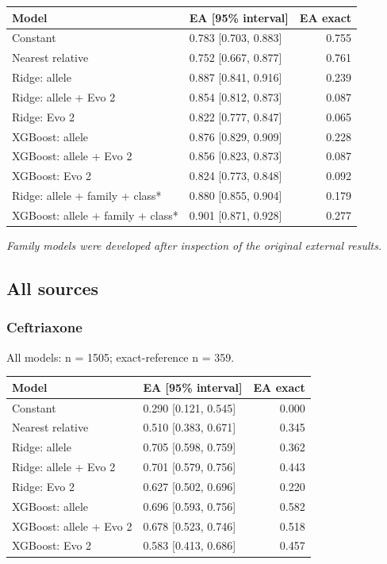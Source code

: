 \documentclass[
  10pt,
]{article}
\newcounter{none} %
\begin{document}
{\def\LTcaptype{none} %
\begin{longtable}[]{@{}llr@{}}
\toprule\noalign{}
Model & EA {[}95\% interval{]} & EA exact \\
\midrule\noalign{}
\endhead
\bottomrule\noalign{}
\endlastfoot
Constant & 0.783 {[}0.703, 0.883{]} & 0.755 \\
Nearest relative & 0.752 {[}0.667, 0.877{]} & 0.761 \\
Ridge: allele & 0.887 {[}0.841, 0.916{]} & 0.239 \\
Ridge: allele + Evo 2 & 0.854 {[}0.812, 0.873{]} & 0.087 \\
Ridge: Evo 2 & 0.822 {[}0.777, 0.847{]} & 0.065 \\
XGBoost: allele & 0.876 {[}0.829, 0.909{]} & 0.228 \\
XGBoost: allele + Evo 2 & 0.856 {[}0.823, 0.873{]} & 0.087 \\
XGBoost: Evo 2 & 0.824 {[}0.773, 0.848{]} & 0.092 \\
Ridge: allele + family + class* & 0.880 {[}0.855, 0.904{]} & 0.179 \\
XGBoost: allele + family + class* & 0.901 {[}0.871, 0.928{]} & 0.277 \\
\end{longtable}
}

\emph{Family models were developed after inspection of the original
external results.}

\subsection{All sources}\label{all-sources}

\subsubsection{Ceftriaxone}\label{ceftriaxone-1}

All models: n = 1505; exact-reference n = 359.

{\def\LTcaptype{none} %
\begin{longtable}[]{@{}llr@{}}
\toprule\noalign{}
Model & EA {[}95\% interval{]} & EA exact \\
\midrule\noalign{}
\endhead
\bottomrule\noalign{}
\endlastfoot
Constant & 0.290 {[}0.121, 0.545{]} & 0.000 \\
Nearest relative & 0.510 {[}0.383, 0.671{]} & 0.345 \\
Ridge: allele & 0.705 {[}0.598, 0.759{]} & 0.362 \\
Ridge: allele + Evo 2 & 0.701 {[}0.579, 0.756{]} & 0.443 \\
Ridge: Evo 2 & 0.627 {[}0.502, 0.696{]} & 0.220 \\
XGBoost: allele & 0.696 {[}0.593, 0.756{]} & 0.582 \\
XGBoost: allele + Evo 2 & 0.678 {[}0.523, 0.746{]} & 0.518 \\
XGBoost: Evo 2 & 0.583 {[}0.413, 0.686{]} & 0.457 \\
\end{longtable}
}
\end{document}
